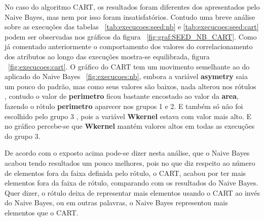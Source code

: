 No caso do algoritmo CART, os resultados foram diferentes dos  apresentados pelo Naive Bayes, mas nem por isso foram insatisfatórios. Contudo uma breve análise sobre as execuções das tabelas ~\ref{tab:execucoes:seed:nb} e \ref{tab:execucoes:seed:cart} podem ser observadas nos gráficos da figura ~\ref{fig:graf:SEED_NB_CART}. Como já comentado anteriormente o comportamento dos valores do correlacionamento dos atributos ao longo das execuções mostra-se equilibrada, figura ~\ref{fig:execucoes:cart}. O gráfico do CART tem um movimento semelhante ao do aplicado do Naive Bayes ~\ref{fig:execucoes:nb}, embora a variável \textbf{asymetry} saia um pouco do padrão, mas como seus valores são baixos, nada alterou nos rótulos , contudo  o valor de \textbf{perimetro} ficou bastante encostado ao valor da \textbf{area}, fazendo o rótulo \textbf{perimetro} aparecer nos grupos 1 e 2. E também só não foi escolhido pelo grupo 3 , pois  a variável \textbf{Wkernel} estava com valor mais alto. E no gráfico percebe-se que  \textbf{Wkernel} mantém valores altos em todas as execuções do grupo 3.

De acordo com o exposto acima pode-se dizer nesta análise, que o Naive Bayes acabou tendo resultados um pouco melhores, pois no que diz respeito ao número de elementos fora da faixa definida pelo rótulo, o CART, acabou por ter mais elementos fora da faixa de rótulo, comparando com os resultados do Naive Bayes. Quer dizer, o rótulo deixa de representar mais elementos usando o CART ao invés do Naive Bayes, ou em outras palavras, o Naive Bayes representou mais elementos que o CART.


